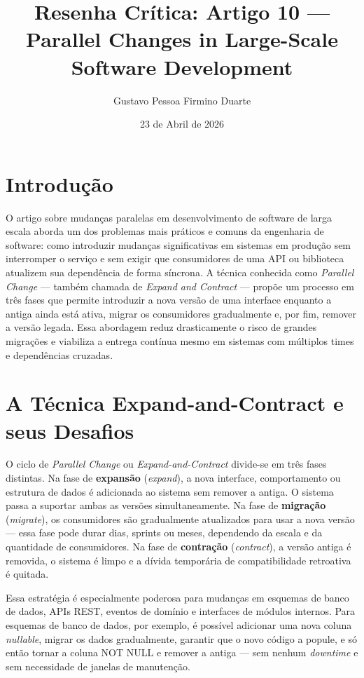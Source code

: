 \documentclass[12pt,a4paper]{article}
\title{Resenha Cr\'itica: Artigo 10 ---\\
Parallel Changes in Large-Scale Software Development}
\author{Gustavo Pessoa Firmino Duarte}
\date{23 de Abril de 2026}
\begin{document}
\maketitle

\section{Introdu\c{c}\~ao}

O artigo sobre mudan\c{c}as paralelas em desenvolvimento de software de larga escala
aborda um dos problemas mais pr\'aticos e comuns da engenharia de software: como
introduzir mudan\c{c}as significativas em sistemas em produ\c{c}\~ao sem interromper
o servi\c{c}o e sem exigir que consumidores de uma API ou biblioteca atualizem sua
depend\^encia de forma s\'incrona. A t\'ecnica conhecida como \textit{Parallel Change}
--- tamb\'em chamada de \textit{Expand and Contract} --- propõe um processo em
tr\^es fases que permite introduzir a nova vers\~ao de uma interface enquanto a
antiga ainda est\'a ativa, migrar os consumidores gradualmente e, por fim, remover
a vers\~ao legada. Essa abordagem reduz drasticamente o risco de grandes migra\c{c}\~oes
e viabiliza a entrega cont\'inua mesmo em sistemas com m\'ultiplos times e
depend\^encias cruzadas.

\section{A T\'ecnica Expand-and-Contract e seus Desafios}

O ciclo de \textit{Parallel Change} ou \textit{Expand-and-Contract} divide-se em
tr\^es fases distintas. Na fase de \textbf{expans\~ao} (\textit{expand}), a nova
interface, comportamento ou estrutura de dados \'e adicionada ao sistema sem remover
a antiga. O sistema passa a suportar ambas as vers\~oes simultaneamente. Na fase
de \textbf{migra\c{c}\~ao} (\textit{migrate}), os consumidores s\~ao gradualmente
atualizados para usar a nova vers\~ao --- essa fase pode durar dias, sprints ou
meses, dependendo da escala e da quantidade de consumidores. Na fase de
\textbf{contra\c{c}\~ao} (\textit{contract}), a vers\~ao antiga \'e removida, o
sistema \'e limpo e a d\'ivida tempor\'aria de compatibilidade retroativa \'e quitada.

Essa estrat\'egia \'e especialmente poderosa para mudan\c{c}as em esquemas de banco
de dados, APIs REST, eventos de dom\'inio e interfaces de m\'odulos internos. Para
esquemas de banco de dados, por exemplo, \'e poss\'ivel adicionar uma nova coluna
\textit{nullable}, migrar os dados gradualmente, garantir que o novo c\'odigo a
popule, e s\'o ent\~ao tornar a coluna NOT NULL e remover a antiga --- sem nenhum
\textit{downtime} e sem necessidade de janelas de manuten\c{c}\~ao.
\end{document}

